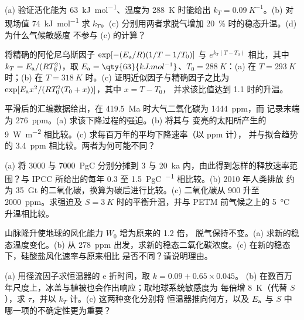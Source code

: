 \begin{exercise}[$\star\star$]\label{exo:b2:deep-time-climate:5}
(a) 验证活化能为 \qty{63}{kJ.mol^{-1}}、温度为 \qty{288}{K} 时能给出 $k_T =
\qty{0.09}{K^{-1}}$。(b) 对现场值 \qty{74}{kJ.mol^{-1}} 求 $k_T$。(c) 分别用两者求脱气增加
\qty{20}{\percent} 时的稳态升温。(d) 为什么气候敏感度
不参与 (c) 的计算？
\end{exercise}

\begin{exercise}[$\star\star$]\label{exo:b2:deep-time-climate:6}
将精确的阿伦尼乌斯因子 $\exp[-(E_{\text a}/R)(1/T - 1/T_0)]$ 与 $e^{k_T(T -
T_0)}$ 相比，其中 $k_T = E_{\text a}/(RT_0^2)$，取 $E_{\text a} = \qty{63}{kJ.mol^{-1}}$、$T_0 =
\qty{288}{K}$：(a) 在 $T = \qty{293}{K}$ 时；(b) 在 $T = \qty{318}{K}$ 时。(c) 证明近似因子与精确因子之比为
$\exp[E_{\text a}x^2/(RT_0^2(T_0 + x))]$，其中 $x = T - T_0$，
并求该比值达到 1.1 时的升温。
\end{exercise}

\begin{exercise}[$\star\star$]\label{exo:b2:deep-time-climate:7}
平滑后的汇编数据给出，在 \qty{419.5}{Ma} 时大气二氧化碳为 \qty{1444}{ppm}，而
记录末端为 \qty{276}{ppm}。(a) 求该下降过程的强迫。(b) 将其与
变亮的太阳所产生的 \qty{9}{W.m^{-2}} 相比较。(c) 求每百万年的平均下降速率（以 ppm 计），
并与拟合趋势的 \qty{3.4}{ppm} 相比较。两者为何可能不同？
\end{exercise}

\begin{exercise}[$\star\star$]\label{exo:b2:deep-time-climate:8}
(a) 将 \num{3000} 与 \qty{7000}{PgC} 分别分摊到 3 与
\qty{20}{ka} 内，由此得到怎样的释放速率范围？与 IPCC 所给出的每年 0.3 至 \qty{1.5}{PgC.^{-1}} 相比较。(b) 2010 年人类排放
约为 \qty{35}{Gt} 的二氧化碳，换算为碳后进行比较。(c) 二氧化碳从 900 升至
\qty{2000}{ppm}。求强迫及 $S =
\qty{3}{K}$ 时的平衡升温，并与 PETM 前气候之上的 \qty{5}{\celsius} 升温相比较。
\end{exercise}

\begin{exercise}[$\star\star$]\label{exo:b2:deep-time-climate:9}
山脉隆升使地球的风化能力 $W_0$ 增为原来的 1.2 倍，
脱气保持不变。(a) 求新的稳态温度变化。(b) 从
\qty{278}{ppm} 出发，求新的稳态二氧化碳浓度。(c) 在新的稳态下，硅酸盐风化速率与原来相比
是否不同？请说明理由。
\end{exercise}

\begin{exercise}[$\star\star\star$]\label{exo:b2:deep-time-climate:10}
(a) 用径流因子求恒温器的 e 折时间，取 $k = 0.09 + 0.65\times0.045$。
(b) 在数百万年尺度上，冰盖与植被也会作出响应；取地球系统敏感度为
每倍增 \qty{8}{K}（代替 $S$），求 $\tau$，并以 $k_T$ 计。(c) 这两种变化分别将
恒温器推向何方，以及 $E_{\text a}$ 与 $S$ 中哪一项的不确定性更为重要？
\end{exercise}

